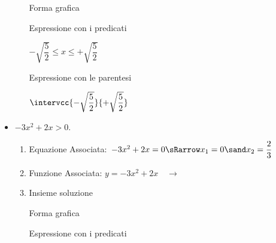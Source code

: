 \begin{esempio}
\begin{itemize}
\begin{enumerate}
  \begin{minipage}{.32\textwidth}
  Forma grafica\\[-.7em]
  
 \begin{center}
  \vspace{.4em}
 \end{center}
  \end{minipage}
  \begin{minipage}{.32\textwidth}
  Espressione con i predicati\\[-.3em]
  
 \begin{center}
  \(-\sqrt{\dfrac{5}{2}} \le x \le +\sqrt{\dfrac{5}{2}}\)
  \vspace{1em}
 \end{center}
  \end{minipage}
  \begin{minipage}{.32\textwidth}
  Espressione con le parentesi\\[-.3em]
  
 \begin{center}
  \(\intervcc{-\sqrt{\dfrac{5}{2}}}{+\sqrt{\dfrac{5}{2}}}\)
  \vspace{.8em}
 \end{center}
  \end{minipage}
\end{enumerate}

\item \(-3x^2 + 2x > 0\).

\begin{enumerate}
 \item
  Equazione Associata:~\(-3x^2 + 2x=0 \sRarrow 
                        x_{1}= 0 \sand x_{2}= \dfrac{2}{3}\)
 \item 
  \begin{minipage}{.45\textwidth}
  Funzione Associata: \(y = -3x^2 + 2x \quad \rightarrow\)
  \end{minipage}
  \begin{minipage}{.30\textwidth}
  \end{minipage}
 \item 
 Insieme soluzione\\
 
  \begin{minipage}{.32\textwidth}
  Forma grafica\\[-.7em]
  
 \begin{center}
  \vspace{.4em}
 \end{center}
  \end{minipage}
  \begin{minipage}{.32\textwidth}
  Espressione con i predicati\\[-.3em]
  

\end{minipage}
\end{enumerate}
\end{itemize}
\end{esempio}
